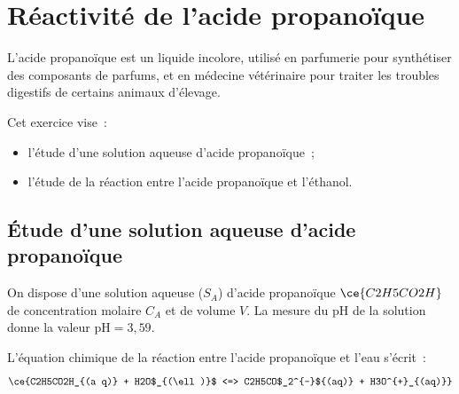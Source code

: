 \section{Réactivité de l'acide propanoïque}
L'acide propanoïque est un liquide incolore, utilisé en parfumerie pour
synthétiser des composants de parfums, et en médecine vétérinaire pour traiter
les troubles digestifs de certains animaux d'élevage.

Cet exercice vise~:
\begin{itemize}
    \item l'étude d'une solution aqueuse d'acide propanoïque~;
    \item l'étude de la réaction entre l'acide propanoïque et l'éthanol.
\end{itemize}

\subsection{Étude d'une solution aqueuse d'acide propanoïque}
On dispose d'une solution aqueuse ($S_A$) d'acide propanoïque $\ce{C2H5CO2H}$ de
concentration molaire $C_A$ et de volume $V$. La mesure du $\mathrm{pH}$ de la
solution donne la valeur $\mathrm{pH}=3,59$.

L'équation chimique de la réaction entre l'acide propanoïque et l'eau s'écrit~:
\[
    \ce{C2H5CO2H_{(a q)} + H2O$_{(\ell)}$ <=>
    C2H5CO$_2^{-}${(aq)} + H3O^{+}_{(aq)}}
\]

